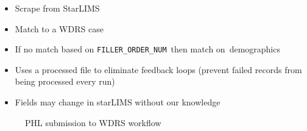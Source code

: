 \documentclass[
]{agujournal2019}
\providecommand{\tightlist}{%
  \setlength{\itemsep}{0pt}\setlength{\parskip}{0pt}}\usepackage{longtable,booktabs,array}
\begin{document}
\begin{itemize}
\tightlist
\item
  Scrape from StarLIMS\hspace{0pt}
\item
  Match to a WDRS case~\hspace{0pt}
\item
  If no match based on \texttt{FILLER\_ORDER\_NUM}~then match
  on~demographics\hspace{0pt}
\item
  Uses a processed file to eliminate feedback loops (prevent failed
  records from being processed every run)\hspace{0pt}
\item
  Fields may change in starLIMS without our knowledge\hspace{0pt}
\end{itemize}

\begin{figure}


\caption{\label{fig-phlflow}PHL submission to WDRS workflow}

\end{figure}%
\end{document}

